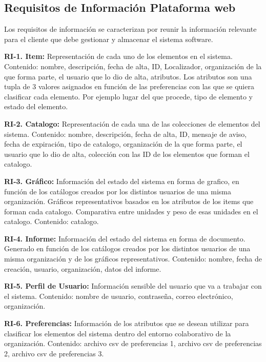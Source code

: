 \documentclass[a4paper,11pt]{book}
\begin{document}
\subsection{Requisitos de Información Plataforma web}

Los requisitos de información se caracterizan por  reunir la información 	relevante para el cliente que debe gestionar y almacenar el sistema software.\par 

\textbf{RI-1. Item:} Representación de cada uno de los elementos en el sistema. 
Contenido: nombre, descripción, fecha de alta, ID, Localizador, organización de la que forma parte, el usuario que lo dio de alta, atributos. Los atributos son una tupla de 3 valores asignados en función de las preferencias con las que se quiera clasificar  cada elemento. Por ejemplo lugar del que procede, tipo de elemento y estado del elemento.


\textbf{RI-2. Catalogo:} Representación de cada una de las colecciones de elementos del sistema. Contenido: nombre, descripción, fecha de alta, ID, mensaje de aviso, fecha de expiración, tipo de catalogo,  organización de la que forma parte, el usuario que lo dio de alta, colección con las ID de los elementos que forman el catalogo.

\textbf{RI-3. Gráfico:} Información del estado del sistema en forma de grafico, en función de los catálogos creados por los distintos usuarios de una misma organización. Gráficos representativos basados en los atributos de los items que forman cada catalogo. Comparativa entre unidades y peso de esas unidades en el catalogo. 
Contenido: catalogo.

\textbf{RI-4. Informe:} Información del estado del sistema en forma de documento. Generado en función de los catálogos creados por los distintos usuarios de una misma organización y de los gráficos representativos. 
Contenido: nombre, fecha de creación, usuario, organización, datos del informe. 

\textbf{RI-5. Perfil de Usuario:} Información sensible del usuario que va a trabajar con el sistema. Contenido: nombre de usuario, contraseña, correo electrónico, organización. 

\textbf{RI-6. Preferencias:} Información de los atributos que se desean utilizar para clasificar los elementos del sistema dentro del entorno colaborativo de la organización.
Contenido: archivo csv de preferencias 1, archivo csv de preferencias 2, archivo csv de preferencias 3. 
\end{document}

